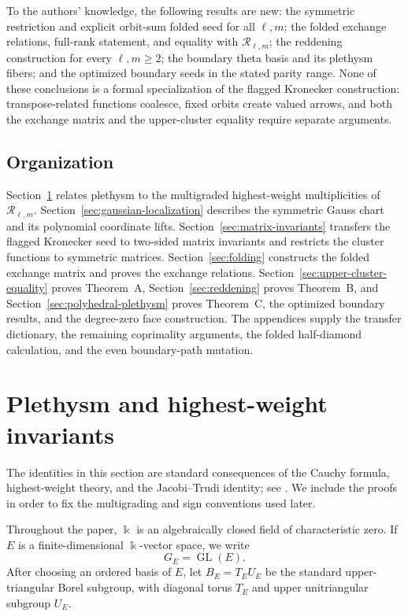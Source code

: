 \documentclass[11pt]{amsart}
\theoremstyle{definition}
\theoremstyle{remark}
\newcommand{\kk}{\Bbbk}
\newcommand{\GL}{\operatorname{GL}}
\newcommand{\cR}{\mathcal R}
\begin{document}
To the authors' knowledge, the following results are new: the symmetric
restriction and explicit orbit-sum folded seed for all $\ell,m$; the folded
exchange relations, full-rank statement, and equality with
$\cR_{\ell,m}$; the reddening construction for every $\ell,m\ge2$; the
boundary theta basis and its plethysm fibers; and the optimized boundary
seeds in the stated parity range.  None of these conclusions is a formal
specialization of the flagged Kronecker construction: transpose-related
functions coalesce, fixed orbits create valued arrows, and both the
exchange matrix and the upper-cluster equality require separate arguments.

\subsection{Organization}

Section~\ref{sec:plethysm-highest-weight} relates plethysm to the
multigraded highest-weight multiplicities of $\cR_{\ell,m}$.
Section~\ref{sec:gaussian-localization} describes the symmetric Gauss chart
and its polynomial coordinate lifts.  Section~\ref{sec:matrix-invariants}
transfers the flagged Kronecker seed to two-sided matrix invariants and
restricts the cluster functions to symmetric matrices.
Section~\ref{sec:folding} constructs the folded exchange matrix and proves
the exchange relations.  Section~\ref{sec:upper-cluster-equality} proves
Theorem~A, Section~\ref{sec:reddening} proves Theorem~B, and
Section~\ref{sec:polyhedral-plethysm} proves Theorem~C, the optimized
boundary results, and the degree-zero face construction.  The appendices
supply the transfer dictionary, the remaining coprimality arguments, the
folded half-diamond calculation, and the even boundary-path mutation.

\section{Plethysm and highest-weight invariants}
\label{sec:plethysm-highest-weight}

The identities in this section are standard consequences of the Cauchy
formula, highest-weight theory, and the Jacobi--Trudi identity; see
\cite[Chapter~I]{Macdonald}.  We include the proofs in order to fix the
multigrading and sign conventions used later.

Throughout the paper, $\kk$ is an algebraically closed field of
characteristic zero.  If $E$ is a finite-dimensional $\kk$-vector space, we
write
\[ G_E=\GL(E). \]
After choosing an ordered basis of $E$, let $B_E=T_EU_E$ be the standard
upper-triangular Borel subgroup, with diagonal torus $T_E$ and upper
unitriangular subgroup $U_E$.
\end{document}

